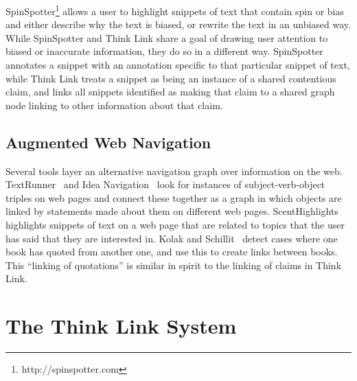\documentclass{chi2009}
\begin{document}
SpinSpotter\footnote{http://spinspotter.com} allows a user to highlight snippets of text that contain spin or bias and either describe why the text is biased, or rewrite the text in an unbiased way. While SpinSpotter and Think Link share a goal of drawing user attention to biased or inaccurate information, they do so in a different way. SpinSpotter annotates a snippet with an annotation specific to that particular snippet of text, while Think Link treats a snippet as being an instance of a shared contentious claim, and links all snippets identified as making that claim to a shared graph node linking to other information about that claim.


\subsection{Augmented Web Navigation}

Several tools layer an alternative navigation graph over information on the web. TextRunner~\cite{Etzioni2008} and Idea Navigation~\cite{Etzioni2008} look for instances of subject-verb-object triples on web pages and connect these together as a graph in which objects are linked by statements made about them on different web pages. 
ScentHighlights~\cite{Chi2005a} highlights snippets of text on a web page that are related to topics that the user has said that they are interested in.  %
Kolak and Schillit~\cite{Kolak2008} detect cases where one book has quoted from another one, and use this to create links between books. This ``linking of quotations'' is similar in spirit to the linking of claims in Think Link. 

% 

% 

\section{The Think Link System}
\end{document}
